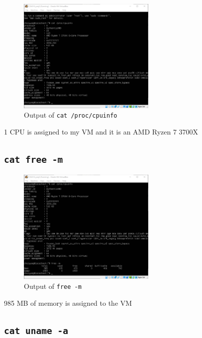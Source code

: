 \documentclass{article}
\begin{document}
\begin{figure}[H]

  \caption{Output of \texttt{cat /proc/cpuinfo}}
  \centering
  \includegraphics[width=0.59\textwidth]{ECE4310_Proj3_2_cpuinfo.png}
\end{figure}

1 CPU is assigned to my VM and it is an AMD Ryzen 7 3700X

\subsection{\texttt{cat free -m}}

\begin{figure}[H]

  \caption{Output of \texttt{free -m}}
  \centering
  \includegraphics[width=0.59\textwidth]{ECE4310_Proj3_2_free.png}
\end{figure}

985 MB of memory is assigned to the VM

\subsection{\texttt{cat uname -a}}
\end{document}
